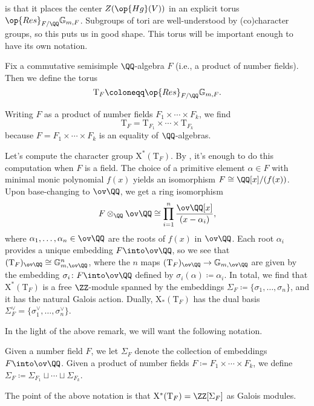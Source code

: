 \documentclass[../thesis.tex]{subfiles}
\begin{document}
 is that it places the center $Z(\op{Hg}(V))$ in an explicit torus $\op{Res}_{F/\QQ}\mathbb G_{m,F}$. Subgroups of tori are well-understood by (co)character groups, so this puts us in good shape. This torus will be important enough to have its own notation.
\begin{notation}
	Fix a commutative semisimple $\QQ$-algebra $F$ (i.e., a product of number fields). Then we define the torus
	\[\mathrm T_F\coloneqq\op{Res}_{F/\QQ}\mathbb G_{m,F}.\]
\end{notation}
\begin{remark} \label{rem:tf-of-algebra}
	Writing $F$ as a product of number fields $F_1\times\cdots\times F_k$, we find
	\[\mathrm T_F=\mathrm T_{F_1}\times\cdots\times\mathrm T_{F_k}\]
	because $F=F_1\times\cdots\times F_k$ is an equality of $\QQ$-algebras.
\end{remark}
\begin{remark}
	Let's compute the character group $\mathrm X^*(\mathrm T_F)$. By , it's enough to do this computation when $F$ is a field. The choice of a primitive element $\alpha\in F$ with minimal monic polynomial $f(x)$ yields an isomorphism $F\cong\QQ[x]/(f(x))$. Upon base-changing to $\ov\QQ$, we get a ring isomorphism
	\[F\otimes_\QQ\ov\QQ\cong\prod_{i=1}^n\frac{\ov\QQ[x]}{(x-\alpha_i)},\]
	where $\alpha_1,\ldots,\alpha_n\in\ov\QQ$ are the roots of $f(x)$ in $\ov\QQ$. Each root $\alpha_i$ provides a unique embedding $F\into\ov\QQ$, so we see that $(\mathrm T_F)_{\ov\QQ}\cong\mathbb G_{m,\ov\QQ}^n$, where the $n$ maps $(\mathrm T_F)_{\ov\QQ}\to\mathbb G_{m,\ov\QQ}$ are given by the embedding $\sigma_i\colon F\into\ov\QQ$ defined by $\sigma_i(\alpha)\coloneqq\alpha_i$. In total, we find that $\mathrm X^*(\mathrm T_F)$ is a free $\ZZ$-module spanned by the embeddings $\Sigma_F\coloneqq\{\sigma_1,\ldots,\sigma_n\}$, and it has the natural Galois action. Dually, $\mathrm X_*(\mathrm T_F)$ has the dual basis $\Sigma_F^\lor=\{\sigma_1^\lor,\ldots,\sigma_n^\lor\}$.
\end{remark}
In the light of the above remark, we will want the following notation.
\begin{notation}
	Given a number field $F$, we let $\Sigma_F$ denote the collection of embeddings $F\into\ov\QQ$. Given a product of number fields $F\coloneqq F_1\times\cdots\times F_k$, we define $\Sigma_F\coloneqq\Sigma_{F_1}\sqcup\cdots\sqcup\Sigma_{F_k}$.
\end{notation}
The point of the above notation is that $\mathrm X^*(\mathrm T_F)=\ZZ[\Sigma_F]$ as Galois modules.
\end{document}
